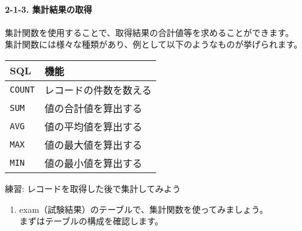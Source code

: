 \begin{Shaded}
\begin{Highlighting}[]
 \OperatorTok{*} 
\NormalTok{ (}\NormalTok{, }\NormalTok{)}
\OperatorTok{\textgreater{}=} \NormalTok{;}

\NormalTok{\# }\OperatorTok{{-}\textgreater{}} 
\end{Highlighting}
\end{Shaded}

\paragraph{2-1-3.
集計結果の取得}\label{ux96c6ux8a08ux7d50ux679cux306eux53d6ux5f97}

集計関数を使用することで、取得結果の合計値等を求めることができます。\\
集計関数には様々な種類があり、例として以下のようなものが挙げられます。

\begin{longtable}[]{@{}ll@{}}
\toprule\noalign{}
SQL & 機能 \\
\midrule\noalign{}
\endhead
\bottomrule\noalign{}
\endlastfoot
\texttt{COUNT} & レコードの件数を数える \\
\texttt{SUM} & 値の合計値を算出する \\
\texttt{AVG} & 値の平均値を算出する \\
\texttt{MAX} & 値の最大値を算出する \\
\texttt{MIN} & 値の最小値を算出する \\
\end{longtable}

練習: レコードを取得した後で集計してみよう

\begin{enumerate}
\def\labelenumi{\arabic{enumi}.}
\tightlist
\item
  exam（試験結果）のテーブルで、集計関数を使ってみましょう。\\
  まずはテーブルの構成を確認します。
\end{enumerate}

\begin{Shaded}
\begin{Highlighting}[]
\end{Highlighting}
\end{Shaded}

